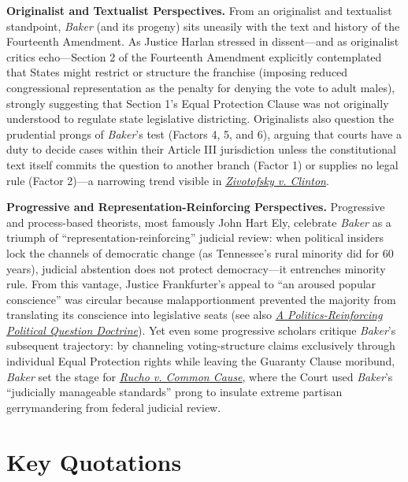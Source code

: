 \documentclass[12pt]{article}
\begin{document}
\textbf{Originalist and Textualist Perspectives.} From an originalist and textualist standpoint, \textit{Baker} (and its progeny) sits uneasily with the text and history of the Fourteenth Amendment. As Justice Harlan stressed in dissent---and as originalist critics echo---Section 2 of the Fourteenth Amendment explicitly contemplated that States might restrict or structure the franchise (imposing reduced congressional representation as the penalty for denying the vote to adult males), strongly suggesting that Section 1's Equal Protection Clause was not originally understood to regulate state legislative districting. Originalists also question the prudential prongs of \textit{Baker}'s test (Factors 4, 5, and 6), arguing that courts have a duty to decide cases within their Article III jurisdiction unless the constitutional text itself commits the question to another branch (Factor 1) or supplies no legal rule (Factor 2)---a narrowing trend visible in \href{https://supreme.justia.com/cases/federal/us/566/189/}{\textit{Zivotofsky v. Clinton}}.

\textbf{Progressive and Representation-Reinforcing Perspectives.} Progressive and process-based theorists, most famously John Hart Ely, celebrate \textit{Baker} as a triumph of ``representation-reinforcing'' judicial review: when political insiders lock the channels of democratic change (as Tennessee's rural minority did for 60 years), judicial abstention does not protect democracy---it entrenches minority rule. From this vantage, Justice Frankfurter's appeal to ``an aroused popular conscience'' was circular because malapportionment prevented the majority from translating its conscience into legislative seats (see also \href{https://ir.lawnet.fordham.edu/cgi/viewcontent.cgi?article=2374&context=faculty_scholarship}{\textit{A Politics-Reinforcing Political Question Doctrine}}). Yet even some progressive scholars critique \textit{Baker}'s subsequent trajectory: by channeling voting-structure claims exclusively through individual Equal Protection rights while leaving the Guaranty Clause moribund, \textit{Baker} set the stage for \href{https://supreme.justia.com/cases/federal/us/588/18-422/}{\textit{Rucho v. Common Cause}}, where the Court used \textit{Baker}'s ``judicially manageable standards'' prong to insulate extreme partisan gerrymandering from federal judicial review.

\section{Key Quotations}
\end{document}
